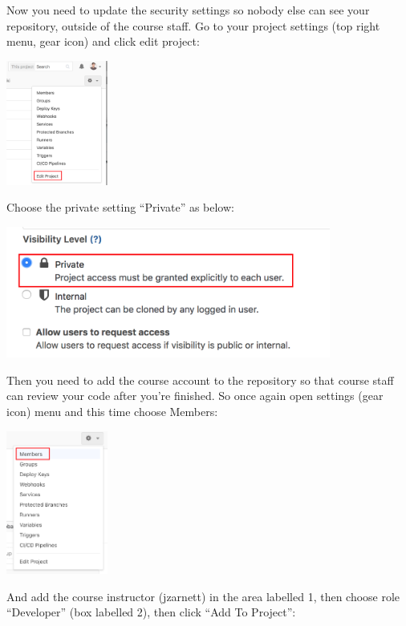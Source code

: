 Now you need to update the security settings so nobody else can see your repository, outside of the course staff. Go to your project settings (top right menu, gear icon) and click edit project:

\begin{center}
	\includegraphics[width=0.25\textwidth]{images/gitlab-settings.png}
\end{center}

Choose the private setting ``Private'' as below:

\begin{center}
	\includegraphics[width=0.8\textwidth]{images/gitlab-private.png}
\end{center}

Then you need to add the course account to the repository so that course staff can review your code after you're finished. So once again open settings (gear icon) menu and this time choose Members:

\begin{center}
	\includegraphics[width=0.25\textwidth]{images/gitlab-members.png}
\end{center}

And add the course instructor (jzarnett) in the area labelled 1, then choose role ``Developer'' (box labelled 2), then click ``Add To Project'':

